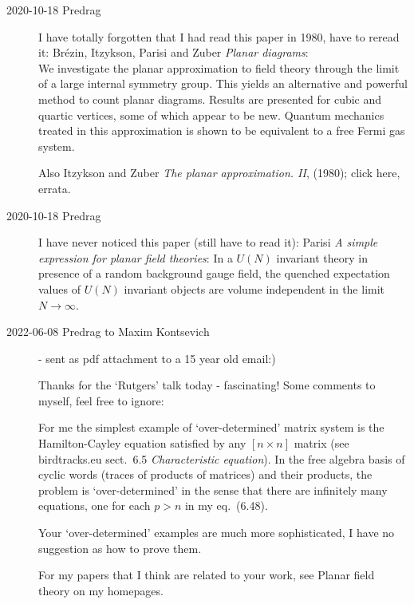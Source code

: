\begin{description}
\item[2020-10-18 Predrag]
I have totally forgotten that I had read this paper in 1980, have to
reread it:
Br{\'{e}}zin, Itzykson, Parisi and Zuber
{{\em Planar diagrams}}:\\
We investigate the planar approximation to field theory through the limit
of a large internal symmetry group. This yields an alternative and
powerful method to count planar diagrams. Results are presented for cubic
and quartic vertices, some of which appear to be new. Quantum mechanics
treated in this approximation is shown to be equivalent to a free Fermi
gas system.

Also
Itzykson and Zuber {\em The planar approximation. {II}},
(1980);
{click here},
 {errata}.

\item[2020-10-18 Predrag]
I have never noticed this paper (still have to read it):
Parisi
{{\em A simple expression for planar field theories}}:
In a $U(N)$ invariant theory in presence of a random background gauge
field, the quenched expectation values of $U(N)$ invariant objects are
volume independent in the limit $N\to\infty$.

\item[2022-06-08 Predrag to Maxim Kontsevich]
- sent as pdf attachment to a 15 year old email:)

Thanks for the `Rutgers' talk today - fascinating!
Some comments to myself, feel free to ignore:

For me the simplest example of `over-determined' matrix system is the
Hamilton-Cayley equation satisfied by any $[n\times{n}]$ matrix (see
birdtracks.eu
{sect.~6.5 {\em Characteristic equation}}). In the free algebra basis of
cyclic words (traces of products of matrices) and their products, the problem
is `over-determined' in the sense that there are infinitely many equations,
one for each $p>n$ in my eq.~(6.48).

Your `over-determined' examples are much more sophisticated, I have no
suggestion as how to prove them.

For my papers that I think are related to your work, see
{Planar field theory} on my homepages.


\end{description}

